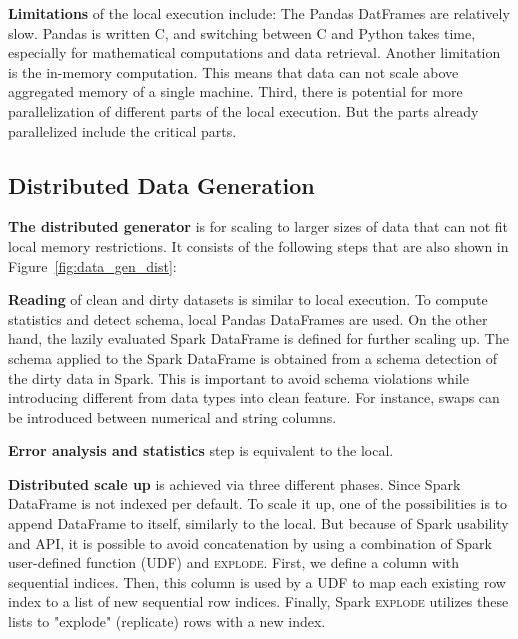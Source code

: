 \textbf{Limitations} of the local execution include:
The Pandas DatFrames are relatively slow. Pandas is written C, and switching between C and Python takes time, especially for mathematical computations and data retrieval.
Another limitation is the in-memory computation. This means that data can not scale above aggregated memory of a single machine.
Third, there is potential for more parallelization of different parts of the local execution. But the parts already parallelized include the critical parts.


\subsection{Distributed Data Generation}
\label{sec:distributed_generator}

\textbf{The distributed generator} is for scaling to larger sizes of data that can not fit local memory restrictions.
It consists of the following steps that are also shown in Figure~\ref{fig:data_gen_dist}:


\textbf{Reading} of clean and dirty datasets is similar to local execution. 
To compute statistics and detect schema, local Pandas DataFrames are used. 
On the other hand, the lazily evaluated Spark DataFrame is defined for further scaling up.
The schema applied to the Spark DataFrame is obtained from a schema detection of the dirty data in Spark.
This is important to avoid schema violations while introducing different from data types into clean feature.  
For instance, swaps can be introduced between numerical and string columns.

\textbf{Error analysis and statistics} step is equivalent to the local.

\textbf{Distributed scale up} is achieved via three different phases. 
Since Spark DataFrame is not indexed per default. 
To scale it up, one of the possibilities is to append DataFrame to itself, similarly to the local.
But because of Spark usability and API, it is possible to avoid concatenation by using a combination of Spark user-defined function (\textsc{UDF}) and \textsc{explode}.
First, we define a column with sequential indices. 
Then, this column is used by a \textsc{UDF} to map each existing row index to a list of new sequential row indices.
Finally, Spark \textsc{explode} utilizes these lists to "explode" (replicate) rows with a new index.

